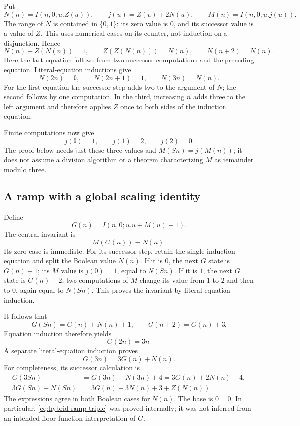 \documentclass[11pt,a4paper]{article}
\theoremstyle{definition}\newtheorem{definition}[theorem]{Definition}
\begin{document}
Put
\[
 N(n)=I(n,0;u.Z(u)),\qquad
 j(u)=Z(u)+2N(u),\qquad
 M(n)=I(n,0;u.j(u)).
\]
The range of $N$ is contained in $\{0,1\}$: its zero value is $0$,
and its successor value is a value of $Z$.  This uses numerical cases
on its counter, not induction on a disjunction.  Hence
\begin{equation}
 N(n)+Z(N(n))=1,\qquad
 Z(Z(N(n)))=N(n),\qquad N(n+2)=N(n).
 \label{eq:hybrid-parity}
\end{equation}
Here the last equation follows from two successor computations and
the preceding equation.  Literal-equation inductions give
\begin{equation}
 N(2n)=0,\qquad N(2n+1)=1,\qquad N(3n)=N(n).
 \label{eq:hybrid-parity-scaling}
\end{equation}
For the first equation the successor step adds two to the argument of
$N$; the second follows by one computation.  In the third, increasing
$n$ adds three to the left argument and therefore applies $Z$ once to
both sides of the induction equation.

Finite computations now give
\[
 j(0)=1,\qquad j(1)=2,\qquad j(2)=0.
\]
The proof below needs just these three values and
$M(Sn)=j(M(n))$; it does not assume a division algorithm or a theorem
characterizing $M$ as remainder modulo three.

\subsection{A ramp with a global scaling identity}

Define
\[
 G(n)=I(n,0;u.u+M(u)+1).
\]
The central invariant is
\begin{equation}
 M(G(n))=N(n).
 \label{eq:hybrid-ramp-invariant}
\end{equation}
Its zero case is immediate.  For its successor step, retain the
single induction equation and split the Boolean value $N(n)$.
If it is $0$, the next $G$ state is $G(n)+1$; its $M$ value is
$j(0)=1$, equal to $N(Sn)$.  If it is $1$, the next $G$ state
is $G(n)+2$; two computations of $M$ change its value from $1$
to $2$ and then to $0$, again equal to $N(Sn)$.  This proves
the invariant by literal-equation induction.

It follows that
\[
 G(Sn)=G(n)+N(n)+1,\qquad G(n+2)=G(n)+3.
\]
Equation induction therefore yields
\begin{equation}
 G(2n)=3n.
 \label{eq:hybrid-ramp-double}
\end{equation}
A separate literal-equation induction proves
\begin{equation}
 G(3n)=3G(n)+N(n).
 \label{eq:hybrid-ramp-triple}
\end{equation}
For completeness, its successor calculation is
\begin{align*}
 G(3Sn)
 &=G(3n)+N(3n)+4
   =3G(n)+2N(n)+4,\\
 3G(Sn)+N(Sn)
 &=3G(n)+3N(n)+3+Z(N(n)).
\end{align*}
The expressions agree in both Boolean cases for $N(n)$.
The base is $0=0$.  In particular,
\eqref{eq:hybrid-ramp-triple} was proved internally; it was not
inferred from an intended floor-function interpretation of $G$.
\end{document}
